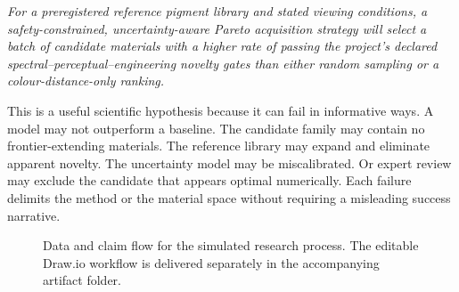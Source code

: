 \documentclass[conference]{IEEEtran}
\begin{document}
\emph{For a preregistered reference pigment library and stated viewing conditions, a safety-constrained, uncertainty-aware Pareto acquisition strategy will select a batch of candidate materials with a higher rate of passing the project's declared spectral--perceptual--engineering novelty gates than either random sampling or a colour-distance-only ranking.}

This is a useful scientific hypothesis because it can fail in informative ways. A model may not outperform a baseline. The candidate family may contain no frontier-extending materials. The reference library may expand and eliminate apparent novelty. The uncertainty model may be miscalibrated. Or expert review may exclude the candidate that appears optimal numerically. Each failure delimits the method or the material space without requiring a misleading success narrative.

\begin{figure}[!t]
\centering
{}
\caption{Data and claim flow for the simulated research process. The editable Draw.io workflow is delivered separately in the accompanying artifact folder.}
\label{fig:agents}
\end{figure}
\end{document}
